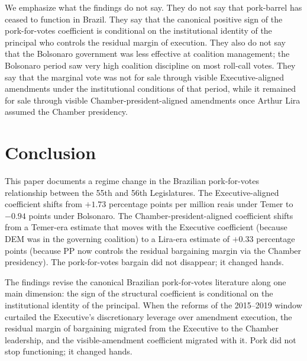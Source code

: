 \documentclass[pdflatex,sn-basic]{sn-jnl}
\begin{document}
We emphasize what the findings do not say. They do not say that pork-barrel has ceased to function in Brazil. They say that the canonical positive sign of the pork-for-votes coefficient is conditional on the institutional identity of the principal who controls the residual margin of execution. They also do not say that the Bolsonaro government was less effective at coalition management; the Bolsonaro period saw very high coalition discipline on most roll-call votes. They say that the marginal vote was not for sale through visible Executive-aligned amendments under the institutional conditions of that period, while it remained for sale through visible Chamber-president-aligned amendments once Arthur Lira assumed the Chamber presidency.

\section{Conclusion}
\label{sec:conclusion}

This paper documents a regime change in the Brazilian pork-for-votes relationship between the 55th and 56th Legislatures. The Executive-aligned coefficient shifts from $+1.73$ percentage points per million reais under Temer to $-0.94$ points under Bolsonaro. The Chamber-president-aligned coefficient shifts from a Temer-era estimate that moves with the Executive coefficient (because DEM was in the governing coalition) to a Lira-era estimate of $+0.33$ percentage points (because PP now controls the residual bargaining margin via the Chamber presidency). The pork-for-votes bargain did not disappear; it changed hands.

The findings revise the canonical Brazilian pork-for-votes literature \citep{PereiraAndMueller2004,Raile2011} along one main dimension: the sign of the structural coefficient is conditional on the institutional identity of the principal. When the reforms of the 2015--2019 window curtailed the Executive's discretionary leverage over amendment execution, the residual margin of bargaining migrated from the Executive to the Chamber leadership, and the visible-amendment coefficient migrated with it. Pork did not stop functioning; it changed hands.
\end{document}
